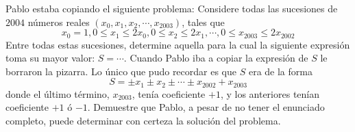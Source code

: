 Pablo estaba copiando el siguiente problema: \newline 
Considere todas las sucesiones de $2004$ números reales $(x_0, x_1, x_2, \cdots , x_{2003})$, tales que
\[ x_0 = 1, 0 \leq x_1 \leq 2x_0, 0 \leq x_2 \leq 2x_1, \cdots , 0 \leq x_{2003} \leq 2x_{2002} \]
Entre todas estas sucesiones, determine aquella para la cual la siguiente expresión toma su mayor valor: $S=\cdots$. \newline 
Cuando Pablo iba a copiar la expresión de $S$ le borraron la pizarra. Lo único que pudo recordar es que $S$ era de la forma
\[ S= \pm x_1 \pm x_2 \pm \cdots \pm x_{2002} + x_{2003} \]
donde el último término, $x_{2003}$, tenía coeficiente $+1$, y los anteriores tenían coeficiente $+1$ ó $-1$. Demuestre que Pablo, a pesar de no tener el enunciado completo, puede determinar con certeza la solución del problema.
